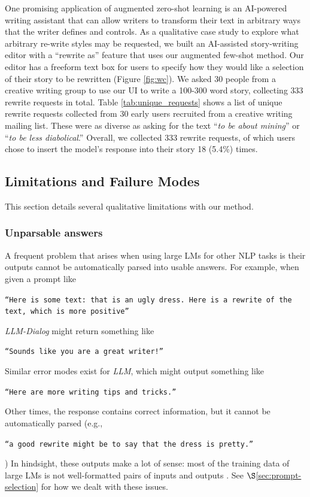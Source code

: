One promising application of augmented zero-shot learning is an AI-powered writing assistant that can allow writers to transform their text in arbitrary ways that the writer defines and controls.
As a qualitative case study to explore what arbitrary re-write styles may be requested, we built an AI-assisted story-writing editor with a ``rewrite as'' feature that uses our augmented few-shot method.
Our editor has a freeform text box for users to specify how they would like a selection of their story to be rewritten (Figure \ref{fig:wc}).
We asked 30 people from a creative writing group to use our UI to write a 100-300 word story,  collecting 333 rewrite requests in total. 
Table \ref{tab:unique_requests} shows a list of unique rewrite requests collected from 30 early users recruited from a creative writing mailing list.
These were as diverse as asking for the text ``\textit{to be about mining}'' or ``\textit{to be less diabolical}.''
Overall, we collected 333 rewrite requests, of which users chose to insert the model's response into their story 18 (5.4\%) times.


\subsection{Limitations and Failure Modes}
\label{section:limitations}
This section details several qualitative limitations with our method.
\subsubsection{Unparsable answers} A frequent problem that arises when using large LMs for other NLP tasks is their outputs cannot be automatically parsed into usable answers. For example, when given a prompt like \begin{small}
 \texttt{``Here is some text: {that is an ugly dress}. Here is a rewrite of the text, which is more positive''} \end{small}
 \textit{LLM-Dialog} might return something like \begin{small}
 \texttt{``Sounds like you are a great writer!''} \end{small} Similar error modes exist for \textit{LLM}, which might output something like \begin{small}
 \texttt{``Here are more writing tips and tricks.''} \end{small} Other times, the response contains correct information, but it cannot be automatically parsed (e.g., \begin{small}
 \texttt{``a good rewrite might be to say that the dress is pretty.''} \end{small}) In hindsight, these outputs make a lot of sense: most of the training data of large LMs is not well-formatted pairs of inputs and outputs  \citep{reynolds2021prompt}. See $\S$\ref{sec:prompt-selection} for how we dealt with these issues.

